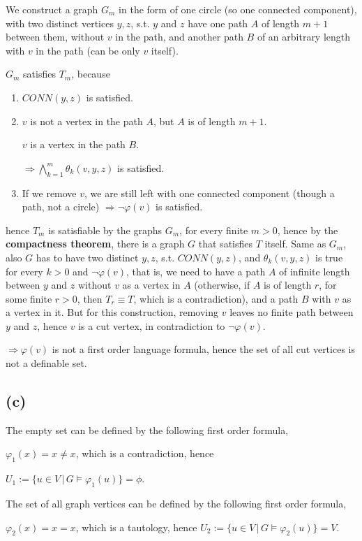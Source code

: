 \documentclass{article}
\begin{document}
We construct a graph $G_m$ in the form of one circle (so one connected component), with two distinct vertices $y,z$, s.t. $y$ and $z$ have one path $A$ of length $m+1$ between them, without $v$ in the path, and another path $B$ of an arbitrary length with $v$ in the path (can be only $v$ itself).

$G_m$ satisfies $T_m$, because
\begin{enumerate}
    \item 
    $CONN(y,z)$ is satisfied.
    \item
    $v$ is not a vertex in the path $A$, but $A$ is of length $m+1$.

    $v$ is a vertex in the path $B$.

    $\Rightarrow\bigwedge_{k=1}^m\theta_k(v,y,z)$ is satisfied.
    \item 
    If we remove $v$, we are still left with one connected component (though a path, not a circle) $\Rightarrow\neg\varphi(v)$ is satisfied.
\end{enumerate}
hence $T_m$ is satisfiable by the graphs $G_m$, for every finite $m>0$, hence by the \textbf{compactness theorem}, there is a graph $G$ that satisfies $T$ itself. Same as $G_m$, also $G$ has to have two distinct $y,z$, s.t. $CONN(y,z)$, and $\theta_k(v,y,z)$ is true for every $k>0$ and $\neg\varphi(v)$, that is, we need to have a path $A$ of infinite length between $y$ and $z$ without $v$ as a vertex in $A$ (otherwise, if $A$ is of length $r$, for some finite $r>0$, then $T_r\equiv{T}$, which is a contradiction), and a path $B$ with $v$ as a vertex in it. But for this construction, removing $v$ leaves no finite path between $y$ and $z$, hence $v$ is a cut vertex, in contradiction to $\neg\varphi(v)$.

$\Rightarrow{\varphi(v)}$ is not a first order language formula, hence the set of all cut vertices is not a definable set.
\subsection*{(c)}
The empty set can be defined by the following first order formula,

$\varphi_1(x)=x\neq{x}$, which is a contradiction, hence 

$U_1:=\{u\in{V}\,|\,{G\vDash\varphi_1(u)}\}=\phi$.

The set of all graph vertices can be defined by the following first order formula,

$\varphi_2(x)=x=x$, which is a tautology, hence $U_2:=\{u\in{V}\,|\,{G\vDash\varphi_2(u)}\}=V$.
\end{document}
